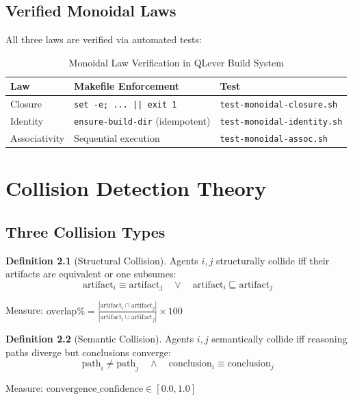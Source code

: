 \documentclass[12pt,oneside,a4paper]{book}
\theoremstyle{definition}
\newtheorem{definition}{Definition}[chapter]
\begin{document}
\section{Verified Monoidal Laws}
\label{sec:monoidal-verification}

All three laws are verified via automated tests:

\begin{table}[h]
\centering
\begin{tabular}{lll}
\toprule
\textbf{Law} & \textbf{Makefile Enforcement} & \textbf{Test} \\
\midrule
Closure & \texttt{set -e; ... || exit 1} & \texttt{test-monoidal-closure.sh} \\
Identity & \texttt{ensure-build-dir} (idempotent) & \texttt{test-monoidal-identity.sh} \\
Associativity & Sequential execution & \texttt{test-monoidal-assoc.sh} \\
\bottomrule
\end{tabular}
\caption{Monoidal Law Verification in QLever Build System}
\label{tab:monoidal-verification}
\end{table}

\chapter{Collision Detection Theory}
\label{ch:collision}


\section{Three Collision Types}
\label{sec:collision-types}

\begin{definition}[Structural Collision]
Agents $i, j$ structurally collide iff their artifacts are equivalent or one subsumes:
$$\text{artifact}_i \equiv \text{artifact}_j \quad \vee \quad \text{artifact}_i \sqsubseteq \text{artifact}_j$$

Measure: $\text{overlap}\% = \frac{|\text{artifact}_i \cap \text{artifact}_j|}{|\text{artifact}_i \cup \text{artifact}_j|} \times 100$
\end{definition}

\begin{definition}[Semantic Collision]
Agents $i, j$ semantically collide iff reasoning paths diverge but conclusions converge:
$$\text{path}_i \neq \text{path}_j \quad \land \quad \text{conclusion}_i \equiv \text{conclusion}_j$$

Measure: $\text{convergence\_confidence} \in [0.0, 1.0]$
\end{definition}
\end{document}
